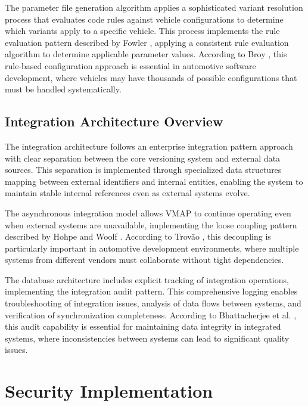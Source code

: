     The parameter file generation algorithm applies a sophisticated variant resolution process that evaluates code rules against vehicle configurations to determine which variants apply to a specific vehicle. This process implements the rule evaluation pattern described by Fowler \cite{fowler2003patterns}, applying a consistent rule evaluation algorithm to determine applicable parameter values. According to Broy \cite{broy2006challenges}, this rule-based configuration approach is essential in automotive software development, where vehicles may have thousands of possible configurations that must be handled systematically.
    
    \subsection{Integration Architecture Overview}
    \label{subsec:integration-architecture}
    
    The integration architecture follows an enterprise integration pattern approach with clear separation between the core versioning system and external data sources. This separation is implemented through specialized data structures mapping between external identifiers and internal entities, enabling the system to maintain stable internal references even as external systems evolve.
    
    The asynchronous integration model allows VMAP to continue operating even when external systems are unavailable, implementing the loose coupling pattern described by Hohpe and Woolf \cite{hohpe2002enterprise}. According to Trovão \cite{trovao2024evolution}, this decoupling is particularly important in automotive development environments, where multiple systems from different vendors must collaborate without tight dependencies.
    
    The database architecture includes explicit tracking of integration operations, implementing the integration audit pattern. This comprehensive logging enables troubleshooting of integration issues, analysis of data flows between systems, and verification of synchronization completeness. According to Bhattacherjee et al. \cite{bhattacherjee2015principles}, this audit capability is essential for maintaining data integrity in integrated systems, where inconsistencies between systems can lead to significant quality issues.
    
    \section{Security Implementation}
    \label{sec:security-implementation}
    
